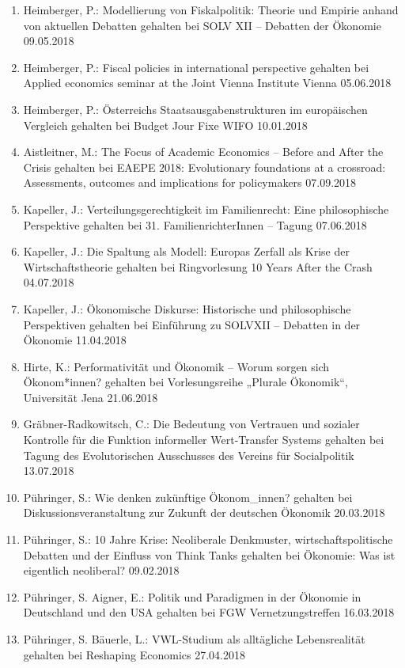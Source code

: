 \begin{enumerate}
	\item Heimberger, P.: Modellierung von Fiskalpolitik: Theorie und Empirie anhand von aktuellen Debatten gehalten bei SOLV XII – Debatten der Ökonomie 09.05.2018
	\item Heimberger, P.: Fiscal policies in international perspective gehalten bei Applied economics seminar at the Joint Vienna Institute Vienna 05.06.2018
	\item Heimberger, P.: Österreichs Staatsausgabenstrukturen im europäischen Vergleich gehalten bei Budget Jour Fixe WIFO 10.01.2018
	\item Aistleitner, M.: The Focus of Academic Economics -- Before and After the Crisis gehalten bei EAEPE 2018: Evolutionary foundations at a crossroad: Assessments, outcomes and implications for policymakers 07.09.2018
	\item Kapeller, J.: Verteilungsgerechtigkeit im Familienrecht: Eine philosophische Perspektive gehalten bei 31. FamilienrichterInnen -- Tagung 07.06.2018
	\item Kapeller, J.: Die Spaltung als Modell: Europas Zerfall als Krise der Wirtschaftstheorie gehalten bei Ringvorlesung 10 Years After the Crash 04.07.2018
	\item Kapeller, J.: Ökonomische Diskurse: Historische und philosophische Perspektiven gehalten bei Einführung zu SOLVXII -- Debatten in der Ökonomie 11.04.2018
	\item Hirte, K.: Performativität und Ökonomik – Worum sorgen sich Ökonom*innen? gehalten bei Vorlesungsreihe „Plurale Ökonomik“, Universität Jena 21.06.2018
	\item Gräbner-Radkowitsch, C.: Die Bedeutung von Vertrauen und sozialer Kontrolle für die Funktion informeller Wert-Transfer Systems gehalten bei Tagung des Evolutorischen Ausschusses des Vereins für Socialpolitik 13.07.2018
	\item Pühringer, S.: Wie denken zukünftige Ökonom\_innen? gehalten bei Diskussionsveranstaltung zur Zukunft der deutschen Ökonomik 20.03.2018
	\item Pühringer, S.: 10 Jahre Krise: Neoliberale Denkmuster, wirtschaftspolitische Debatten und der Einfluss von Think Tanks gehalten bei Ökonomie: Was ist eigentlich neoliberal? 09.02.2018
	\item Pühringer, S. Aigner, E.: Politik und Paradigmen in der Ökonomie in Deutschland und den USA gehalten bei FGW Vernetzungstreffen 16.03.2018
	\item Pühringer, S. Bäuerle, L.: VWL-Studium als alltägliche Lebensrealität gehalten bei Reshaping Economics 27.04.2018

\end{enumerate}
